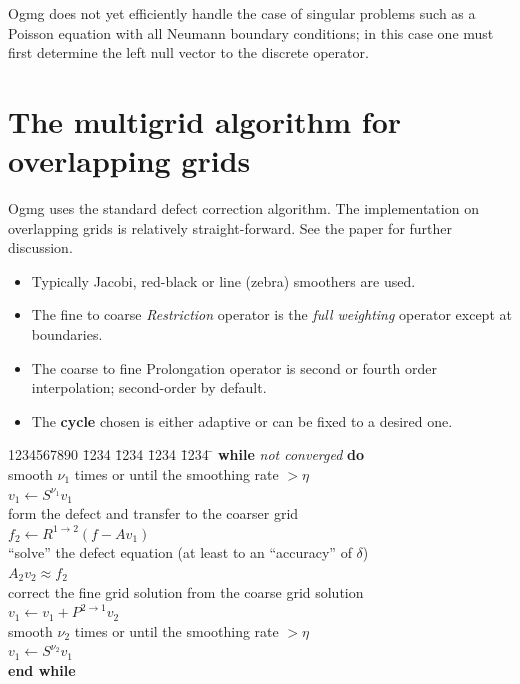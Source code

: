 \documentclass{article}
\begin{document}
Ogmg does not yet efficiently handle the case of singular problems such as a Poisson equation
with all Neumann boundary conditions; in this case one must first determine the left null vector
to the discrete operator. 


\section{The multigrid algorithm for overlapping grids}

Ogmg uses the standard defect correction algorithm. The implementation
on overlapping grids is relatively straight-forward. See the paper \cite{CGMG}
for further discussion.

\begin{itemize}
\item Typically Jacobi, red-black or line (zebra) smoothers are used.

\item The fine to coarse {\sl Restriction} operator is the {\it full weighting}
operator except at boundaries.

\item The coarse to fine Prolongation operator is second or fourth
order interpolation; second-order by default.

\item The {\bf cycle} chosen is either adaptive or can be fixed
to a desired one.
\end{itemize}


\begin{tabbing}
1234567890 \= 1234 \= 1234 \= 1234 \= 1234 \=  \kill  %
\> {\bf while} {\it not converged} {\bf do}                   \\
\>\>  smooth $\nu_1$ times or until the smoothing rate $> \eta$      \\
\>\>\>  $v_1 \gets S^{\nu_1} v_1$                                    \\
\>\>    form the defect and transfer to the coarser grid             \\
\>\>\>  $f_2 \gets R^{1\to2} ( f-A v_1) $                            \\
\>\>  ``solve'' the defect equation (at least to an
                ``accuracy'' of $\delta$) \\
\>\>\>    $A_2 v_2 \approx f_2$                                      \\
\>\>    correct the fine grid solution from the coarse grid solution \\
\>\>\>  $v_1 \gets v_1 + P^{2\to1} v_2 $                             \\
\>\>  smooth $\nu_2$ times or until the smoothing rate $> \eta$      \\
\>\>\>  $v_1 \gets S^{\nu_2} v_1$                                    \\
\> {\bf end while}
\end{tabbing}
\end{document}

